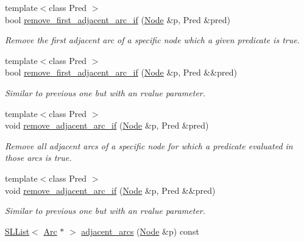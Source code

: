 \begin{DoxyCompactItemize}
{\footnotesize template$<$class Pred $>$ }\\bool \hyperlink{class_designar_1_1_base_graph_ab7c2c2129abb3200b854e23f34e513e8}{remove\+\_\+first\+\_\+adjacent\+\_\+arc\+\_\+if} (\hyperlink{namespace_designar_a5af326c65aa2bd26b26c410f2030d09e}{Node} \&p, Pred \&pred)
\begin{DoxyCompactList}\small\item\em Remove the first adjacent arc of a specific node which a given predicate is true. \end{DoxyCompactList}\item 
{\footnotesize template$<$class Pred $>$ }\\bool \hyperlink{class_designar_1_1_base_graph_abe36f7676c51362b9a0f560d3c062772}{remove\+\_\+first\+\_\+adjacent\+\_\+arc\+\_\+if} (\hyperlink{namespace_designar_a5af326c65aa2bd26b26c410f2030d09e}{Node} \&p, Pred \&\&pred)
\begin{DoxyCompactList}\small\item\em Similar to previous one but with an rvalue parameter. \end{DoxyCompactList}\item 
{\footnotesize template$<$class Pred $>$ }\\void \hyperlink{class_designar_1_1_base_graph_af1653bc8e50c53d27997951798a8a716}{remove\+\_\+adjacent\+\_\+arc\+\_\+if} (\hyperlink{namespace_designar_a5af326c65aa2bd26b26c410f2030d09e}{Node} \&p, Pred \&pred)
\begin{DoxyCompactList}\small\item\em Remove all adjacent arcs of a specific node for which a predicate evaluated in those arcs is true. \end{DoxyCompactList}\item 
{\footnotesize template$<$class Pred $>$ }\\void \hyperlink{class_designar_1_1_base_graph_a10423075ea81c629e88974fa882ec903}{remove\+\_\+adjacent\+\_\+arc\+\_\+if} (\hyperlink{namespace_designar_a5af326c65aa2bd26b26c410f2030d09e}{Node} \&p, Pred \&\&pred)
\begin{DoxyCompactList}\small\item\em Similar to previous one but with an rvalue parameter. \end{DoxyCompactList}\item 
\hyperlink{class_designar_1_1_s_l_list}{S\+L\+List}$<$ \hyperlink{namespace_designar_a3f55fb5513d62ff47cbc8f72b8e95d6f}{Arc} $\ast$ $>$ \hyperlink{class_designar_1_1_base_graph_a128e77ef80ed0a40bf307ea06736664b}{adjacent\+\_\+arcs} (\hyperlink{namespace_designar_a5af326c65aa2bd26b26c410f2030d09e}{Node} \&p) const

\end{DoxyCompactItemize}
